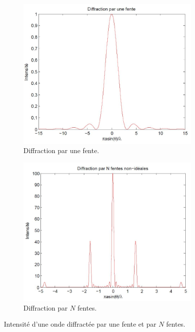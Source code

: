 \begin{figure}[ht]
	\centering
	\begin{subfigure}[b]{0.45\textwidth}
		\centering
		\includegraphics[scale=0.4]{img/diffraction1.jpg}
		\caption{Diffraction par une fente.}
		\label{fig:diffraction1}
	\end{subfigure}
	\begin{subfigure}[b]{0.45\textwidth}
		\centering
		\includegraphics[scale=0.4]{img/diffraction3.jpg}
		\caption{Diffraction par $N$ fentes.}
		\label{fig:diffractionN}
	\end{subfigure}
	\caption{Intensité d'une onde diffractée par une fente et par $N$ fentes.}
\end{figure}

